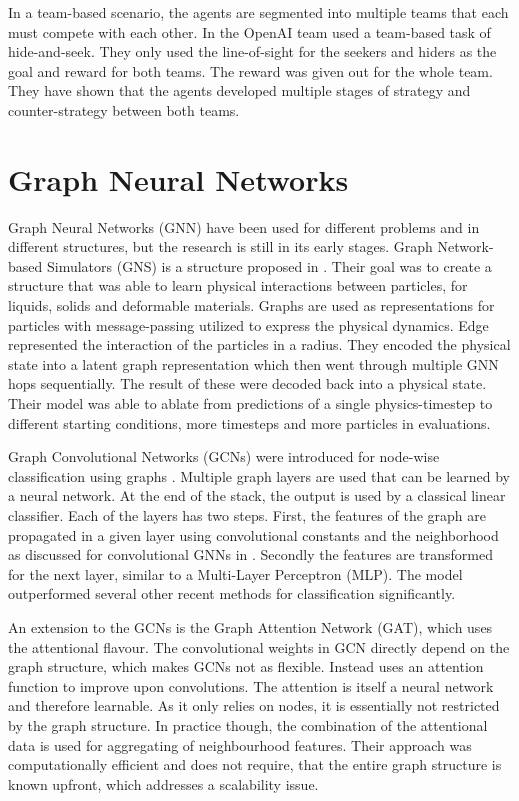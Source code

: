 In a team-based scenario, the agents are segmented into multiple teams that each must compete with each other. In \citet{Teams2019} the OpenAI team used a team-based task of hide-and-seek. They only used the line-of-sight for the seekers and hiders as the goal and reward for both teams. The reward was given out for the whole team. They have shown that the agents developed multiple stages of strategy and counter-strategy between both teams.




\section{Graph Neural Networks}
Graph Neural Networks (GNN) have been used for different problems and in different structures, but the research is still in its early stages. Graph Network-based Simulators (GNS) is a structure proposed in \citet{GNS2020}. Their goal was to create a structure that was able to learn physical interactions between particles, for liquids, solids and deformable materials. Graphs are used as representations for particles with message-passing utilized to express the physical dynamics. Edge represented the interaction of the particles in a radius. They encoded the physical state into a latent graph representation which then went through multiple GNN hops sequentially. The result of these were decoded back into a physical state. Their model was able to ablate from predictions of a single physics-timestep to different starting conditions, more timesteps and more particles in evaluations. \par

Graph Convolutional Networks (GCNs) were introduced for node-wise classification using graphs \citep{SGCN2019}. Multiple graph layers are used that can be learned by a neural network. At the end of the stack, the output is used by a classical linear classifier. Each of the layers has two steps. First, the features of the graph are propagated in a given layer using convolutional constants and the neighborhood as discussed for convolutional GNNs in . Secondly the features are transformed for the next layer, similar to a Multi-Layer Perceptron (MLP). The model outperformed several other recent methods for classification significantly. \par

An extension to the GCNs is the Graph Attention Network (GAT), which uses the attentional flavour. The convolutional weights in GCN directly depend on the graph structure, which makes GCNs not as flexible. Instead \citet{GAT2017} uses an attention function to improve upon convolutions. The attention is itself a neural network and therefore learnable. As it only relies on nodes, it is essentially not restricted by the graph structure. In practice though, the combination of the attentional data is used for aggregating of neighbourhood features. Their approach was computationally efficient and does not require, that the entire graph structure is known upfront, which addresses a scalability issue. \par

